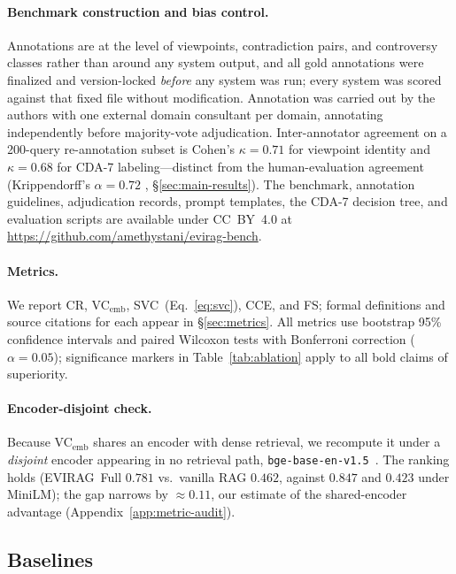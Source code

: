 \documentclass[11pt]{article}
\newcommand{\system}{\textsc{EVIRAG}\xspace}
\begin{document}
\paragraph{Benchmark construction and bias control.}
Annotations are at the level of viewpoints, contradiction pairs, and
controversy classes rather than around any system output, and all gold
annotations were finalized and version-locked \emph{before} any system was
run; every system was scored against that fixed file without modification.  Annotation was carried out by the authors with one external
domain consultant per domain, annotating independently before majority-vote
adjudication.  Inter-annotator agreement on a 200-query re-annotation subset
is Cohen's $\kappa{=}0.71$ \citep{cohen1960coefficient} for viewpoint identity
and $\kappa{=}0.68$ for CDA-7 labeling---distinct from the human-evaluation
agreement (Krippendorff's $\alpha{=}0.72$
\citep{krippendorff2011computing}, \S\ref{sec:main-results}).
The benchmark, annotation guidelines, adjudication records, prompt templates,
the CDA-7 decision tree, and evaluation scripts are available under CC~BY~4.0
at \url{https://github.com/amethystani/evirag-bench}.


\paragraph{Metrics.}
We report CR, VC$_\text{emb}$, SVC~(Eq.~\ref{eq:svc}), CCE, and FS; formal
definitions and source citations for each appear in \S\ref{sec:metrics}.
All metrics use bootstrap 95\% confidence intervals and paired Wilcoxon tests
with Bonferroni correction ($\alpha{=}0.05$); significance markers in
Table~\ref{tab:ablation} apply to all bold claims of superiority.

\paragraph{Encoder-disjoint check.}
\label{sec:encoder-check}
Because VC$_\text{emb}$ shares an encoder with dense retrieval, we recompute it
under a \emph{disjoint} encoder appearing in no retrieval path,
\texttt{bge-base-en-v1.5}~\citep{xiao2024cpack}.  The ranking holds (\system\
Full $0.781$ vs.\ vanilla RAG $0.462$, against $0.847$ and $0.423$ under
MiniLM); the gap narrows by $\approx0.11$, our estimate of the shared-encoder
advantage (Appendix~\ref{app:metric-audit}).

\subsection{Baselines}
\label{sec:baselines}
\end{document}
